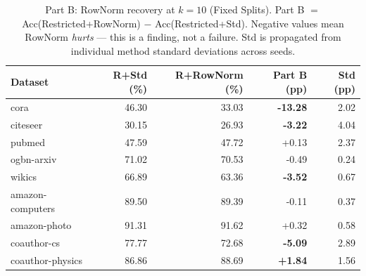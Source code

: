 \begin{table}[t]
\centering\small\setlength{\tabcolsep}{6pt}
\caption{Part B: RowNorm recovery at $k=10$ (Fixed Splits). Part B $=$ Acc(Restricted+RowNorm) $-$ Acc(Restricted+Std). Negative values mean RowNorm \emph{hurts} --- this is a finding, not a failure. Std is propagated from individual method standard deviations across seeds.}
\label{tab:part_b_fixed}
\begin{tabular}{lrrrr}
\toprule
Dataset & R+Std (\%) & R+RowNorm (\%) & Part B (pp) & Std (pp) \\
\midrule
cora & 46.30 & 33.03 & \textbf{-13.28} & 2.02 \\
citeseer & 30.15 & 26.93 & \textbf{-3.22} & 4.04 \\
pubmed & 47.59 & 47.72 & +0.13 & 2.37 \\
ogbn\mbox{-}arxiv & 71.02 & 70.53 & -0.49 & 0.24 \\
wikics & 66.89 & 63.36 & \textbf{-3.52} & 0.67 \\
amazon\mbox{-}computers & 89.50 & 89.39 & -0.11 & 0.37 \\
amazon\mbox{-}photo & 91.31 & 91.62 & +0.32 & 0.58 \\
coauthor\mbox{-}cs & 77.77 & 72.68 & \textbf{-5.09} & 2.89 \\
coauthor\mbox{-}physics & 86.86 & 88.69 & \textbf{+1.84} & 1.56 \\
\bottomrule\end{tabular}\end{table}
